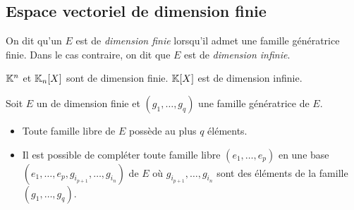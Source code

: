 \documentclass{magnolia}
\begin{document}
\subsection{Espace vectoriel de dimension finie}
\begin{definition}[utile=-3]
On dit qu'un \Kev $E$ est de \emph{dimension finie} lorsqu'il admet une famille
génératrice finie. Dans le cas contraire, on dit que $E$ est de \emph{dimension
infinie}.
\end{definition}

\begin{remarqueUnique}
\remarque $\mathbb{K}^n$ et $\polyK[n]$ sont de dimension finie. $\polyK$ est
  de dimension infinie.
\end{remarqueUnique}


\begin{proposition}[utile=2,nom={Lemme de \nom{Steinitz}}]
Soit $E$ un \Kev de dimension finie et $(g_1,\ldots,g_q)$ une famille génératrice de $E$.
\begin{itemize}
\item Toute famille libre de $E$ possède au plus $q$ éléments.
\item Il est possible de compléter toute famille libre $(e_1,\ldots,e_p)$ en une base
$(e_1,\ldots,e_p,g_{i_{p+1}},\ldots,g_{i_n})$ de $E$ où $g_{i_{p+1}},
\ldots,g_{i_n}$ sont des éléments de la famille $(g_1,\ldots,g_q)$.
\end{itemize}

\end{proposition}
\end{document}
